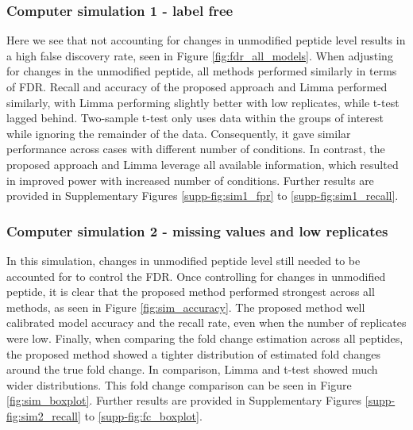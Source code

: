 \documentclass[mcp]{article}
\numberwithin{figure}{section} %
\numberwithin{table}{section}
\begin{document}
\subsubsection*{Computer simulation 1 - label free} 

Here we see that not accounting for changes in unmodified peptide level results in a high false discovery rate, seen in Figure \ref{fig:fdr_all_models}. When adjusting for changes in the unmodified peptide, all methods performed similarly in terms of FDR. Recall and accuracy of the proposed approach and Limma performed similarly, with Limma performing slightly better with low replicates, while t-test lagged behind. Two-sample t-test only uses data within the groups of interest while ignoring the remainder of the data. Consequently, it gave similar performance across cases with different number of conditions. In contrast, the proposed approach and Limma leverage all available information, which resulted in improved power with increased number of conditions. Further results are provided in Supplementary Figures \ref{supp-fig:sim1_fpr} to \ref{supp-fig:sim1_recall}. 

\subsubsection*{Computer simulation 2 - missing values and low replicates} 

In this simulation, changes in unmodified peptide level still needed to be accounted for to control the FDR. Once controlling for changes in unmodified peptide, it is clear that the proposed method performed strongest across all methods, as seen in Figure \ref{fig:sim_accuracy}. The proposed method well calibrated model accuracy and the recall rate, even when the number of replicates were low. Finally, when comparing the fold change estimation across all peptides, the proposed method showed a tighter distribution of estimated fold changes around the true fold change. In comparison, Limma and t-test showed much wider distributions. This fold change comparison can be seen in Figure \ref{fig:sim_boxplot}. Further results are provided in Supplementary Figures \ref{supp-fig:sim2_recall} to \ref{supp-fig:fc_boxplot}. 

\end{document}
